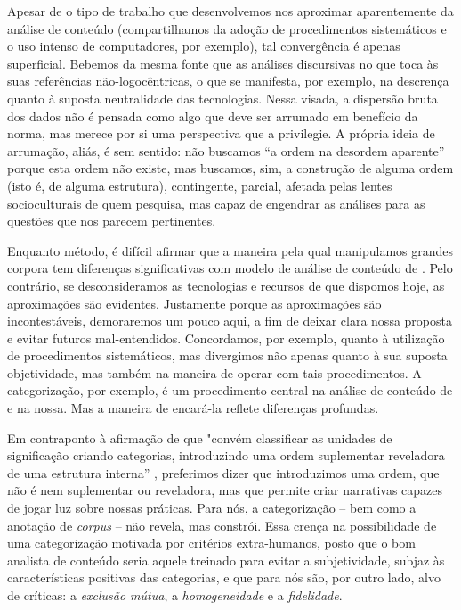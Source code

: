 \documentclass[portuguese]{textolivre}
\begin{document}
Apesar de o tipo de trabalho que desenvolvemos nos aproximar aparentemente da análise de conteúdo (compartilhamos da adoção de procedimentos sistemáticos e o uso intenso de computadores, por exemplo), tal convergência é apenas superficial. Bebemos da mesma fonte que as análises discursivas no que toca às suas referências não-logocêntricas, o que se manifesta, por exemplo, na descrença quanto à suposta neutralidade das tecnologias. Nessa visada, a dispersão bruta dos dados não é pensada como algo que deve ser arrumado em benefício da norma, mas merece por si uma perspectiva que a privilegie. A própria ideia de arrumação, aliás, é sem sentido: não buscamos “a ordem na desordem aparente” porque esta ordem não existe, mas buscamos, sim, a construção de alguma ordem (isto é, de alguma estrutura), contingente, parcial, afetada pelas lentes socioculturais de quem pesquisa, mas capaz de engendrar as análises para as questões que nos parecem pertinentes.

Enquanto método, é difícil afirmar que a maneira pela qual manipulamos grandes corpora tem diferenças significativas com modelo de análise de conteúdo de \textcite{bardln1977}. Pelo contrário, se desconsideramos as tecnologias e recursos de que dispomos hoje, as aproximações são evidentes. Justamente porque as aproximações são incontestáveis, demoraremos um pouco aqui, a fim de deixar clara nossa proposta e evitar futuros mal-entendidos. Concordamos, por exemplo, quanto à utilização de procedimentos sistemáticos, mas divergimos não apenas quanto à sua suposta objetividade, mas também na maneira de operar com tais procedimentos. A categorização, por exemplo, é um procedimento central na análise de conteúdo de \textcite{bardln1977} e na nossa. Mas a maneira de encará-la reflete diferenças profundas.

Em contraponto à afirmação de que "convém classificar as unidades de significação criando categorias, introduzindo uma ordem suplementar reveladora de uma estrutura interna” \cite[p. 55]{bardln1977}, preferimos dizer que introduzimos uma ordem, que não é nem suplementar ou reveladora, mas que permite criar narrativas capazes de jogar luz sobre nossas práticas.  Para nós, a categorização – bem como a anotação de \textit{corpus} – não revela, mas constrói. Essa crença na possibilidade de uma categorização motivada por critérios extra-humanos, posto que o bom analista de conteúdo seria aquele treinado para evitar a subjetividade, subjaz às características positivas das categorias, e que para nós são, por outro lado, alvo de críticas: a \textit{exclusão mútua}, a \textit{homogeneidade} e a \textit{fidelidade}.
\end{document}
